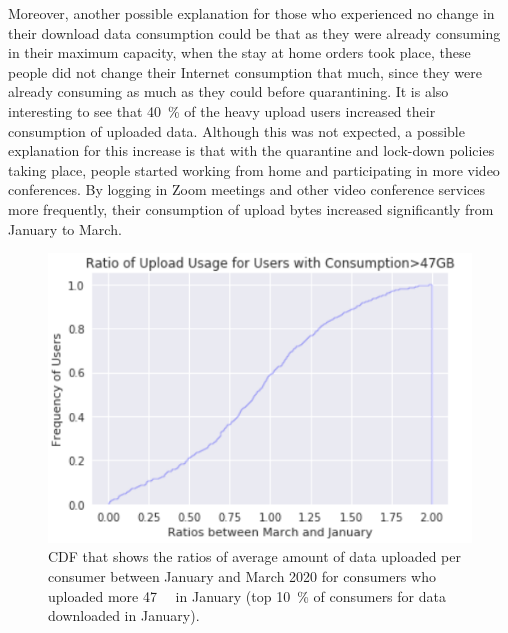 \documentclass[conference,10pt]{IEEEtran}
\begin{document}
Moreover, another possible explanation for those who experienced no change in their download data consumption could be that as they were already consuming in their maximum capacity, when the stay at home orders took place, these people did not change their Internet consumption that much, since they were already consuming as much as they could before quarantining. It is also interesting to see that \SI{40}{\percent} of the heavy upload users increased their consumption of uploaded data. Although this was not expected, a possible explanation for this increase is that with the quarantine and lock-down policies taking place, people started working from home and participating in more video conferences. By logging in Zoom meetings and other video conference services more frequently, their consumption of upload bytes increased significantly from January to March.
\begin{figure}
\centering
\includegraphics[width=1.0\linewidth]{figs/heavyup.PNG}
\caption{CDF that shows the ratios of average amount of data uploaded per consumer between January and March 2020 for consumers who uploaded more \SI{47}{\giga\byte} in January (top \SI{10}{\percent} of consumers for data downloaded in January).}
\label{fig:heavyup}
\end{figure}

\end{document}
